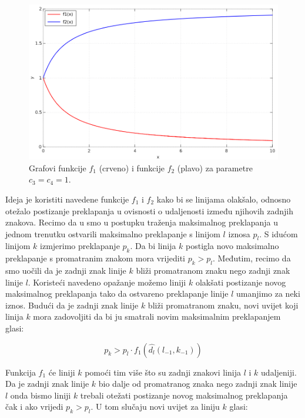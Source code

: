 \documentclass[times, utf8, zavrsni]{fer}
\begin{document}
\begin{figure}[htb]
    \centering
    \captionsetup{justification=centering,margin=2cm}
    \includegraphics[width=\textwidth]{images/function-01.png}
    \caption{
        Grafovi funkcije $f_1$ (crveno) i funkcije $f_2$ (plavo) za parametre
        $c_3 = c_4 = 1$.
    }
    \label{fig:function-01}
\end{figure}

\pagebreak

Ideja je koristiti navedene funkcije $f_1$ i $f_2$ kako bi se linijama
olakšalo, odnosno otežalo postizanje preklapanja u ovisnosti o udaljenosti
između njihovih zadnjih znakova. Recimo da u smo u postupku traženja maksimalnog
preklapanja u jednom trenutku ostvarili maksimalno preklapanje s linijom $l$
iznosa $p_l$. S idućom linijom $k$ izmjerimo preklapanje $p_k$. Da bi linija
$k$ postigla novo maksimalno preklapanje s promatranim znakom mora vrijediti
$p_k > p_l$. Međutim, recimo da smo uočili da je zadnji znak linije $k$
bliži promatranom znaku nego zadnji znak linije $l$. Koristeći navedeno
opažanje možemo liniji $k$ olakšati postizanje novog maksimalnog
preklapanja tako da ostvareno preklapanje linije $l$ umanjimo za neki iznos.
Budući da je zadnji znak linije $k$ bliži promatranom znaku, novi uvijet koji
linija $k$ mora zadovoljiti da bi ju smatrali novim maksimalnim preklapanjem
glasi:

\begin{equation}
p_k > p_l \cdot f_1(\hat{d_l}(l_{-1},k_{-1}))
\end{equation}

Funkcija $f_1$ će liniji $k$ pomoći tim više što su zadnji znakovi linija
$l$ i $k$ udaljeniji. Da je zadnji znak linije $k$ bio dalje od
promatranog znaka nego zadnji znak linije $l$ onda bismo liniji $k$ trebali
otežati postizanje novog maksimalnog preklapanja čak i ako vrijedi $p_k > p_l$.
U tom slučaju novi uvijet za liniju $k$ glasi:
\end{document}
